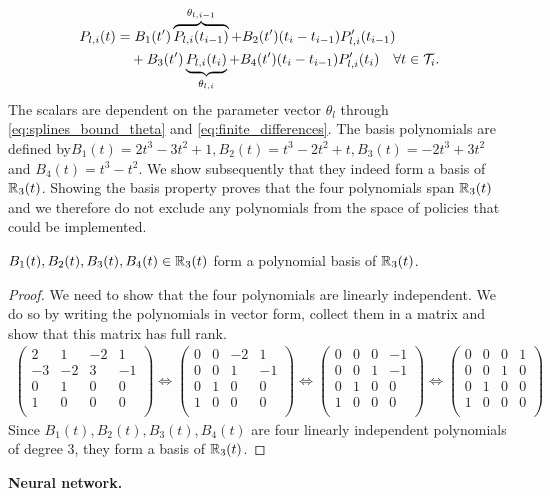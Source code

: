 \begin{align}
P_{l,i}(t) &= B_1(t') \overbrace{P_{l,i}(t_{i-1})}^{\theta_{l,i-1}} + B_2(t') (t_{i} - t_{i-1}) P'_{l,i}(t_{i-1})  \\& \quad + B_3(t') \underbrace{P_{l,i}(t_{i})}_{\theta_{l,i}} + B_4(t') (t_{i} - t_{i-1}) P'_{l,i}(t_{i}) \quad \forall t \in \mathcal{T}_i. \notag
\end{align}
The scalars are dependent on the parameter vector $\theta_l$ through \eqref{eq:splines_bound_theta} and \eqref{eq:finite_differences}. The basis polynomials are defined by$B_1(t) = 2t^3 - 3t^2 +1, B_2(t) = t^3 - 2t^2 +t, B_3(t) = -2t^3 + 3t^2$ and $B_4(t) = t^3 - t^2$. We show subsequently that they indeed form a basis of $\mathbb{R}_3(t)$. Showing the basis property proves that the four polynomials span $\mathbb{R}_3(t)$ and we therefore do not exclude any polynomials from the space of policies that could be implemented.
\begin{theorem}
$B_1(t), B_2(t), B_3(t), B_4(t) \in \mathbb{R}_3(t)$ form a polynomial basis of $\mathbb{R}_3(t)$.
\end{theorem}
\begin{proof}
We need to show that the four polynomials are linearly independent. We do so by writing the polynomials in vector form, collect them in a matrix and show that this matrix has full rank. 
\begin{align*}
\begin{pmatrix}
2 & 1 & -2 & 1\\
-3 & -2 & 3 & -1 \\
0 & 1 & 0 & 0 \\
1 & 0 & 0 & 0 \\
\end{pmatrix}
\Leftrightarrow
\begin{pmatrix}
0 & 0 & -2 & 1\\
0 & 0 & 1 & -1 \\
0 & 1 & 0 & 0 \\
1 & 0 & 0 & 0 \\
\end{pmatrix}
\Leftrightarrow
\begin{pmatrix}
0 & 0 & 0 & -1\\
0 & 0 & 1 & -1 \\
0 & 1 & 0 & 0 \\
1 & 0 & 0 & 0 \\
\end{pmatrix}
\Leftrightarrow
\begin{pmatrix}
0 & 0 & 0 & 1\\
0 & 0 & 1 & 0 \\
0 & 1 & 0 & 0 \\
1 & 0 & 0 & 0 \\
\end{pmatrix}
\end{align*}
Since $B_1(t), B_2(t), B_3(t), B_4(t)$ are four linearly independent polynomials of degree 3, they form a basis of $\mathbb{R}_3(t)$. 
\end{proof} 

\textbf{Neural network.} 

 
